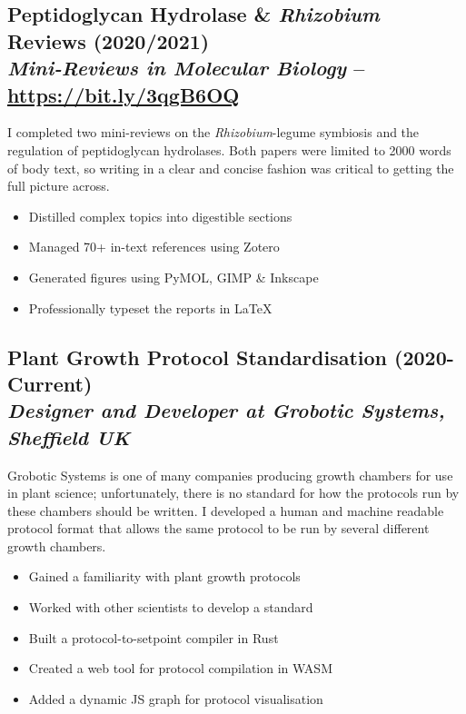 \documentclass[twocolumn, a4paper, fontsize=9pt, headsepline, footsepline]{scrartcl}
\begin{document}
\subsection*{Peptidoglycan Hydrolase \& \emph{Rhizobium} Reviews
  (2020/2021)\\\textmd{\emph{Mini-Reviews in Molecular Biology} – \url{https://bit.ly/3qgB6OQ}}}
\noindent
I completed two mini-reviews on the \emph{Rhizobium}-legume symbiosis and the
regulation of peptidoglycan hydrolases. Both papers were limited to 2000 words
of body text, so writing in a clear and concise fashion was critical to getting
the full picture across.
\begin{itemize}
\item Distilled complex topics into digestible sections
\item Managed 70+ in-text references using Zotero
\item Generated figures using PyMOL, GIMP \& Inkscape
\item Professionally typeset the reports in \LaTeX
\end{itemize}

\subsection*{Plant Growth Protocol Standardisation
  (2020-Current)\\\textmd{\emph{Designer and Developer at Grobotic Systems, Sheffield UK}}}
\noindent
Grobotic Systems is one of many companies producing growth chambers for use in
plant science; unfortunately, there is no standard for how the protocols run by
these chambers should be written. I developed a human and machine readable
protocol format that allows the same protocol to be run by several different
growth chambers.
\begin{itemize}
\item Gained a familiarity with plant growth protocols
\item Worked with other scientists to develop a standard
\item Built a protocol-to-setpoint compiler in Rust
\item Created a web tool for protocol compilation in WASM
\item Added a dynamic JS graph for protocol visualisation
\end{itemize}
\end{document}
